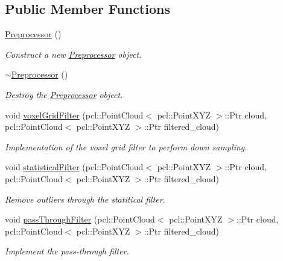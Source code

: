 \subsection*{Public Member Functions}
\begin{DoxyCompactItemize}
\item 
\hyperlink{classhull__abstraction_1_1_preprocessor_aa1e7b3418d273ceddd2faa0777f3598c}{Preprocessor} ()
\begin{DoxyCompactList}\small\item\em Construct a new \hyperlink{classhull__abstraction_1_1_preprocessor}{Preprocessor} object. \end{DoxyCompactList}\item 
\hyperlink{classhull__abstraction_1_1_preprocessor_a880dfe2a68232c6aea2ad41743df3d97}{$\sim$\+Preprocessor} ()
\begin{DoxyCompactList}\small\item\em Destroy the \hyperlink{classhull__abstraction_1_1_preprocessor}{Preprocessor} object. \end{DoxyCompactList}\item 
void \hyperlink{classhull__abstraction_1_1_preprocessor_a423d6c8cb5b08f8387290aae47184b3b}{voxel\+Grid\+Filter} (pcl\+::\+Point\+Cloud$<$ pcl\+::\+Point\+X\+YZ $>$\+::Ptr cloud, pcl\+::\+Point\+Cloud$<$ pcl\+::\+Point\+X\+YZ $>$\+::Ptr filtered\+\_\+cloud)
\begin{DoxyCompactList}\small\item\em Implementation of the voxel grid filter to perform down sampling. \end{DoxyCompactList}\item 
void \hyperlink{classhull__abstraction_1_1_preprocessor_a494877684eca0eaf7207c8655140b692}{statistical\+Filter} (pcl\+::\+Point\+Cloud$<$ pcl\+::\+Point\+X\+YZ $>$\+::Ptr cloud, pcl\+::\+Point\+Cloud$<$ pcl\+::\+Point\+X\+YZ $>$\+::Ptr filtered\+\_\+cloud)
\begin{DoxyCompactList}\small\item\em Remove outliers through the statitical filter. \end{DoxyCompactList}\item 
void \hyperlink{classhull__abstraction_1_1_preprocessor_a4912126b50bdac35c63f521e3bc04314}{pass\+Through\+Filter} (pcl\+::\+Point\+Cloud$<$ pcl\+::\+Point\+X\+YZ $>$\+::Ptr cloud, pcl\+::\+Point\+Cloud$<$ pcl\+::\+Point\+X\+YZ $>$\+::Ptr filtered\+\_\+cloud)
\begin{DoxyCompactList}\small\item\em Implement the pass-\/through filter. \end{DoxyCompactList}\item 

\end{DoxyCompactItemize}
